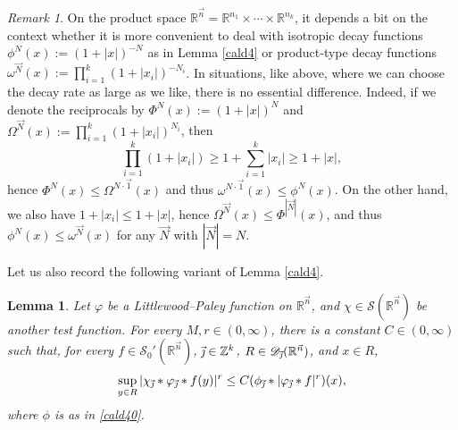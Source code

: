 \documentclass[11pt, reqno]{amsart}
\newtheorem{lemma}[theorem]{Lemma}
\theoremstyle{definition}
\theoremstyle{remark}
\newtheorem{remark}[theorem]{Remark}
\numberwithin{equation}{section}
\newcommand{\D}{\mathscr D}
\newcommand{\R}{\mathbb R}
\newcommand{\Sc}{\mathscr S}
\newcommand{\Z}{\mathbb Z}
\newcommand{\vone}{\vec 1}
\newcommand{\vj}{\vec{\textit{\j}}}
\newcommand{\vn}{\vec n}
\newcommand{\vN}{\vec N}
\newcommand{\abs}[1]{|#1|}
\begin{document}
\begin{remark}
On the product space $\R^{\vn}=\R^{n_1}\times\cdots\times\R^{n_k}$, it depends a bit on the context whether it is more convenient to deal with isotropic decay functions $\phi^N(x):=(1+\abs{x})^{-N}$ as in Lemma \ref{cald4}
or product-type decay functions $\omega^{\vN}(x):=\prod_{i=1}^k(1+\abs{x_i})^{-N_i}$. In situations, like above, where we can choose the decay rate as large as we like, there is no essential difference. Indeed, if we denote the reciprocals by $\Phi^N(x):=(1+\abs{x})^{N}$ and $\Omega^{\vN}(x):=\prod_{i=1}^k(1+\abs{x_i})^{N_i}$, then
\begin{equation*}
\prod_{i=1}^k(1+\abs{x_i})\geq 1+\sum_{i=1}^k\abs{x_i}\geq 1+\abs{x},
\end{equation*}
hence $\Phi^N(x)\leq\Omega^{N\cdot\vone}(x)$ and thus $\omega^{N\cdot\vone}(x)\leq\phi^{N}(x)$. On the other hand, we also have $1+\abs{x_i}\leq 1+\abs{x}$, hence $\Omega^{\vN}(x)\leq\Phi^{\abs{\vN}}(x)$, and thus $\phi^{N}(x)\leq\omega^{\vN}(x)$ for any $\vN$ with $\abs{\vN}=N$.
\end{remark}

Let us also record the following variant of Lemma \ref{cald4}.

\begin{lemma}\label{cald5}
Let $\varphi$ be a Littlewood--Paley function on $\R^{\vn}$, and $\chi\in\Sc(\R^{\vn})$ be another test function.
For every $M,r\in(0,\infty)$, there is a constant $C\in(0,\infty)$ such that, for every $f\in\Sc_0'(\R^{\vn})$, $\vj\in\Z^k$, $R\in\D_{\vj}(\R^{\vn})$, and $x\in R$,
\begin{equation*}
\sup_{y\in R}\abs{\chi_{\vj}*\varphi_{\vj}*f(y)}^r\leq C(\phi_{\vj}*\abs{\varphi_{\vj}*f}^r)(x),
\end{equation*}
where $\phi$ is as in \eqref{cald40}.
\end{lemma}
\end{document}
